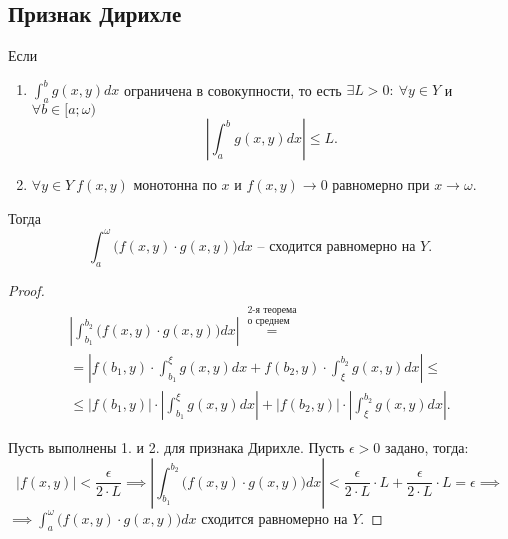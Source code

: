 \subsection{Признак Дирихле}

\begin{theorem}
    Если
    \begin{enumerate}
        \item $\int_{a}^{b}g(x,y)dx$ ограничена в совокупности, то есть $\exists L > 0: \ \forall y \in Y$ и $\forall b \in [a;\omega)$
              \[
                  \left|\int_{a}^{b}g(x,y)dx\right| \leqslant L.
              \]
        \item $\forall y \in Y \ f(x,y)$ монотонна по $x$ и $f(x,y) \rightarrow 0$ равномерно при $x \rightarrow \omega$.
    \end{enumerate}

    Тогда
    \[
        \int_{a}^{\omega}\big(f(x,y)\cdot g(x,y)\big)dx \text{ -- сходится равномерно на } Y.
    \]
\end{theorem}

\begin{proof}
    \begin{multline*}
        \left|\int_{b_1}^{b_2}\big(f(x,y)\cdot g(x,y)\big)dx\right| \overset{\begin{array}{c}
                \text{2-я теорема} \\
                \text{о среднем}
            \end{array}}{=} \\
        = \left|f(b_1,y)\cdot \int_{b_1}^{\xi}g(x,y)dx + f(b_2,y)\cdot \int_{\xi}^{b_2}g(x,y)dx\right| \leqslant \\
        \leqslant \left|f(b_1,y)\right| \cdot \left|\int_{b_1}^{\xi}g(x,y)dx\right| + \left|f(b_2,y)\right| \cdot \left|\int_{\xi}^{b_2}g(x,y)dx\right|.
    \end{multline*}

    Пусть выполнены 1. и 2. для признака Дирихле. Пусть $\epsilon > 0$ задано, тогда:
    \[
        \left|f(x,y)\right| < \frac{\epsilon}{2\cdot L} \implies \left|\int_{b_1}^{b_2}\big(f(x,y)\cdot g(x,y)\big)dx\right| < \frac{\epsilon}{2\cdot L} \cdot L + \frac{\epsilon}{2 \cdot L} \cdot L = \epsilon \implies
    \]
    $\implies \int_{a}^{\omega}\big(f(x,y)\cdot g(x,y)\big)dx$ сходится равномерно на $Y$.
\end{proof}